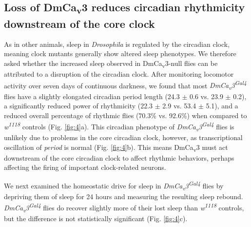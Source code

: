 \subsection*{Loss of DmCa\textsubscript{v}3 reduces circadian rhythmicity downstream of the core clock}

As in other animals, sleep in \emph{Drosophila} is regulated by the circadian clock, meaning clock mutants generally show altered sleep phenotypes\cite{hendricks:2003aa, parisky:2008aa}.
We therefore asked whether the increased sleep observed in DmCa\textsubscript{v}3-null flies can be attributed to a disruption of the circadian clock.
After monitoring locomotor activity over seven days of continuous darkness, we found that most \emph{DmCa\textsubscript{v}3\textsuperscript{Gal4}} flies have a slightly elongated circadian period length (24.3 $\pm$ 0.6 vs. 23.9 $\pm$ 0.2), a significantly reduced power of rhythmicity (22.3 $\pm$ 2.9 vs. 53.4 $\pm$ 5.1), and a reduced overall percentage of rhythmic flies (70.3\% vs. 92.6\%) when compared to \emph{w\textsuperscript{1118}} controls (Fig. \ref{fig:4}a).
This circadian phenotype of \emph{DmCa\textsubscript{v}3\textsuperscript{Gal4}} flies is unlikely due to problems in the core circadian clock, however, as transcriptional oscillation of \emph{period} is normal (Fig. \ref{fig:4}b).
This means DmCa\textsubscript{v}3 must act downstream of the core circadian clock to affect rhythmic behaviors, perhaps affecting the firing of important clock-related neurons.

We next examined the homeostatic drive for sleep in \emph{DmCa\textsubscript{v}3\textsuperscript{Gal4}} flies by depriving them of sleep for 24 hours and measuring the resulting sleep rebound. \emph{DmCa\textsubscript{v}3\textsuperscript{Gal4}} flies do recover slightly more of their lost sleep than \emph{w\textsuperscript{1118}} controls, but the difference is not statistically significant (Fig. \ref{fig:4}c).
